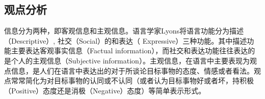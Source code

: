 \subsection{观点分析}


信息分为两种，即客观信息和主观信息。语言学家Lyons将语言功能分为描述（Descriptive）, 社交（Social）的和表达（ Expressive）三种功能。其中描述功能主要表达客观事实信息（Factual information），而社交和表达功能往往表达的是个人的主观信息（Subjective information）。主观信息，在语言中主要表现为观点信息，是人们在语言中表达出的对于所谈论目标事物的态度、情感或者看法。观点常常简化为对目标事物的认同或不认同（或者认为目标事物好或者坏，持积极（Positive）态度还是消极（Negative）态度）等简单表示形式。

